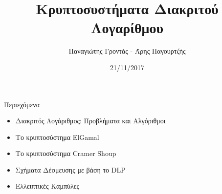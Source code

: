 \documentclass[handout]{beamer}
\title{Κρυπτοσυστήματα Διακριτού Λογαρίθμου}
\author{Παναγιώτης Γροντάς - Άρης Παγουρτζής}
\date{21/11/2017}
\institute{ΕΜΠ - Κρυπτογραφία (2017-2018)}
\begin{document}
\setlength{\columnseprule}{0.4pt}

\newcommand{\xor}{ \oplus }
\newcommand{\MSG}{ \mathtt{M} }
\newcommand{\KEY}{ \mathtt{K} }
\newcommand{\CPH}{ \mathtt{C} }
\newcommand{\keygen}{\mathtt{KeyGen}}
\newcommand{\enc}{\mathtt{Encrypt}}
\newcommand{\dec}{\mathtt{Decrypt}}
\newcommand{\adv}{$\mathcal{A}$ }
\newcommand{\advb}{$\mathcal{B} \,$ }
\newcommand{\chal}{$\mathcal{C} \,$ }
\newcommand{\hash}{$\mathcal{H} \,$ }
\newcommand{\cs}{$\mathcal{CS} \,$ }
\newcommand{\zns}{  \mathbb{Z}^*_n }
\newcommand{\zn}[1]{  \mathbb{Z}^*_#1 }

\newcommand{\green}[1]{\textcolor{teal}{#1}}
\newcommand{\Green}[1]{\textcolor{Teal}{#1}}
\newcommand{\ForestGreen}[1]{\textcolor{ForestGreen}{#1}}
\newcommand{\blue}[1]{\textcolor{blue}{#1}}
\newcommand{\magenta}[1]{\textcolor{magenta}{#1}}
\newcommand{\cyan}[1]{\textcolor{cyan}{#1}}

\newcommand{\twopartdef}[4]
{ 
		\begin{cases}
			#1 , #2 \\
			#3 , #4
		\end{cases} 
}

\npthousandsep{ }
\begin{frame}
\titlepage
\end{frame}



\begin{frame}{Περιεχόμενα}
\begin{itemize}
\item Διακριτός Λογάριθμος: Προβλήματα και Αλγόριθμοι
\pause
\item Το κρυπτοσύστημα ElGamal
\pause 
\item Το κρυπτοσύστημα Cramer Shoup
\pause
\item Σχήματα Δέσμευσης με βάση το DLP
\pause
\item Ελλειπτικές Καμπύλες
\pause
\end{itemize}
\end{frame}
\end{document}
